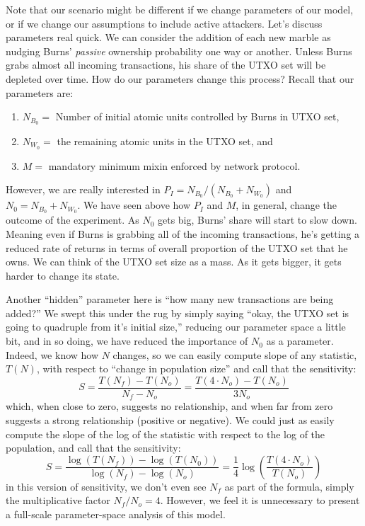 \documentclass{mrl}
\begin{document}
Note that our scenario might be different if we change parameters of our model, or if we change our assumptions to include active attackers. Let's discuss parameters real quick. We can consider the addition of each new marble as nudging Burns' \emph{passive} ownership probability one way or another. Unless Burns grabs almost all incoming transactions, his share of the UTXO set will be depleted over time. How do our parameters change this process? Recall that our parameters are:
\begin{enumerate}
\item $N_{B_0} = $ Number of initial atomic units controlled by Burns in UTXO set,
\item $N_{W_0} = $ the remaining atomic units in the UTXO set, and
\item $M = $ mandatory minimum mixin enforced by network protocol.
\end{enumerate}
However, we are really interested in $P_I = N_{B_0}/(N_{B_0} + N_{W_0})$ and $N_0 = N_{B_0} + N_{W_0}$. We have seen above how $P_I$ and $M$, in general, change the outcome of the experiment. As $N_0$ gets big, Burns' share will start to slow down. Meaning even if Burns is grabbing all of the incoming transactions, he's getting a reduced rate of returns in terms of overall proportion of the UTXO set that he owns. We can think of the UTXO set size as a mass. As it gets bigger, it gets harder to change its state. 

Another ``hidden'' parameter here is ``how many new transactions are being added?'' We swept this under the rug by simply saying ``okay, the UTXO set is going to quadruple from it's initial size,'' reducing our parameter space a little bit, and in so doing, we have reduced the importance of $N_0$ as a parameter. Indeed, we know how $N$ changes, so we can easily compute slope of any statistic, $T(N)$, with respect to ``change in population size'' and call that the sensitivity:
\[S = \frac{T(N_f) - T(N_o)}{N_f - N_o} = \frac{T(4\cdot N_o) - T(N_o)}{3N_o}\]
which, when close to zero, suggests no relationship, and when far from zero suggests a strong relationship (positive or negative). We could just as easily compute the slope of the log of the statistic with respect to the log of the population, and call that the sensitivity:
\[S = \frac{\log(T(N_f)) - \log(T(N_0))}{\log(N_f)-\log(N_o)} = \frac{1}{4}\log\left(\frac{T(4\cdot N_o)}{T(N_o)}\right)\]
in this version of sensitivity, we don't even see $N_f$ as part of the formula, simply the multiplicative factor $N_f/N_o = 4$. However, we feel it is unnecessary to present a full-scale parameter-space analysis of this model.
\end{document}

